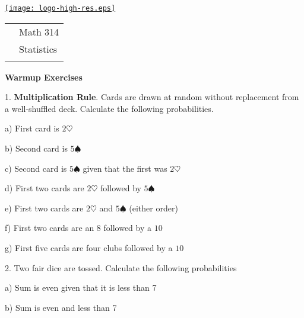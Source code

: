 \documentclass[10pt]{article}
\begin{document}
\pagestyle{empty}
\lstset{language=R, showspaces=false, showstringspaces=false}

\href{http://www.shepherd.edu}{\texttt{[image: logo-high-res.eps]}}
\vspace{-1.69cm}

{\small
\begin{tabular}{cl}
& Math 314\\
& Statistics\\
\hspace{5.28in} & %
\end{tabular}
}
\setlength{\baselineskip}{1.05\baselineskip}
\bigskip

\begin{center}
\textbf{\large  Warmup Exercises}
\end{center}
\medskip
\newcommand{\Z}{\hphantom{0}}

1. \textbf{Multiplication Rule}. 
Cards are drawn at random without replacement from a well-shuffled deck.
Calculate the following probabilities.
\medskip

\hspace{20pt} a) First card is $\mbox{2}\heartsuit$
\bigskip\medskip

\hspace{20pt} b) Second card is $\mbox{5}\spadesuit$
\bigskip\medskip

\hspace{20pt} c) Second card is $\mbox{5}\spadesuit$ given that 
the first was $\mbox{2}\heartsuit$
\bigskip\medskip

\hspace{20pt} d) First two cards are $\mbox{2}\heartsuit$ followed by $\mbox{5}\spadesuit$
\bigskip\medskip

\hspace{20pt} e) First two cards are $\mbox{2}\heartsuit$ 
and $\mbox{5}\spadesuit$ (either order)
\bigskip\medskip

\hspace{20pt} f) First two cards are an $8$ followed by a $10$
\bigskip\medskip

\hspace{20pt} g) First five cards are four clubs followed by a $10$
\bigskip\bigskip

2. Two fair dice are tossed. Calculate the following probabilities
\medskip

\hspace{20pt} a) Sum is even given that it is less than 7
\bigskip

\hspace{20pt} b) Sum is even and less than 7
\bigskip\bigskip
\end{document}
